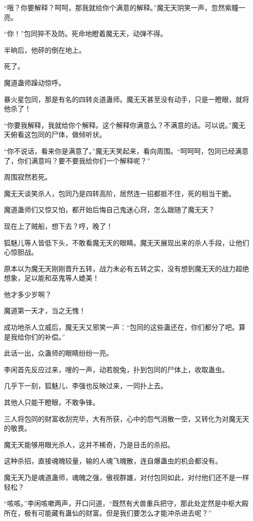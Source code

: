 \begin{this_body}
“哦？你要解释？呵呵，那我就给你个满意的解释。”魔无天阴笑一声，忽然紫瞳一亮。

“你！”包同猝不及防。死命地瞪着魔无天，动弹不得。

半晌后，他砰的倒在地上。

死了。

魔道蛊师躁动惊呼。

暴火星包同，那是有名的四转炎道蛊师。魔无天甚至没有动手，只是一瞪眼，就将他杀了！

“你要我解释，我就给你个解释。这个解释你满意么？不满意的话。可以说。”魔无天俯看这包同的尸体，做倾听状。

“你不说话，看来你是满意了。”魔无天笑起来，看向周围。“呵呵呵，包同已经满意了，你们满意吗？要不要我给你们一个解释呢？”

周围寂然若死。

魔无天谈笑杀人，包同乃是四转高阶，居然连一招都抵不住，死的相当干脆。

魔道蛊师们又惊又怕，都开始后悔自己鬼迷心窍，怎么跟随了魔无天？

现在上了贼船，想下去？哼，晚了！

狐魅儿等人皆低下头，不敢看魔无天的眼睛。魔无天展现出来的杀人手段，让他们心惊胆战。

原本以为魔无天刚刚晋升五转，战力未必有五转之实，没有想到魔无天的战力超绝想象，足以能和巫鬼等人媲美！

他才多少岁啊？

魔道第一天才，当之无愧！

成功地杀人立威后，魔无天又邪笑一声：“包同的这些蛊还在，你们都分了吧。算是我给你们的补偿。”

此话一出，众蛊师的眼睛纷纷一亮。

李闲首先反应过来，嗖的一声，动若脱兔，扑到包同的尸体上，收取蛊虫。

几乎下一刻，狐魅儿、李强也反映过来，一同扑上去。

其他人只能干瞪眼，不敢争锋。

三人将包同的财富收刮完毕，大有所获，心中的怨气消散一空，又转化为对魔无天的敬畏。

魔无天能够用眼光杀人，这并不稀奇，乃是目击的杀招。

这种杀招，直接魂魄较量，输的人魂飞魄散，连自爆蛊虫的机会都没有。

魔无天乃是魂道蛊师，魂魄之强，傲视群雄，对付包同如此，对付他们还不是一样轻松？

“咳咳。”李闲咳嗽两声，开口问道，“既然有犬兽重兵把守，那此处定然是中枢大殿所在，极有可能藏有蛊仙的财富。但是我们要怎么才能冲杀进去呢？”


\end{this_body}
